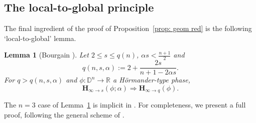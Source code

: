 \documentclass[reqno]{amsart}
\numberwithin{equation}{section}
\newcommand{\D}{\mathbb{D}}
\newcommand{\R}{\mathbb{R}}
\newcommand{\bH}{\mathbf{H}}
\theoremstyle{plain}
\newtheorem{lemma}[theorem]{Lemma}
\theoremstyle{definition}
\begin{document}



\subsection{The local-to-global principle} The final ingredient of the proof of Proposition~\ref{prop: geom red} is the following `local-to-global' lemma.

\begin{lemma}[Bourgain \cite{Bourgain1991}]\label{lem: loc to glob} Let $2 \leq s \leq q(n)$, $\alpha s < \tfrac{n+1}{2}$ and 
\begin{equation*}
   q(n, s, \alpha) := 2 + \frac{2s}{n+1 - 2\alpha s}.  
\end{equation*}
For $q > q(n, s, \alpha)$ and $\phi \colon \D^n \to \R$ a H\"ormander-type phase, 
\begin{equation*}
    \bH_{\infty \to s}(\phi; \alpha) \Rightarrow \bH_{\infty \to q}(\phi).
\end{equation*}
\end{lemma}

The $n=3$ case of Lemma~\ref{lem: loc to glob} is implicit in \cite{Bourgain1991}. For completeness, we present a full proof,  following the general scheme of \cite{Bourgain1991}.
\end{document}
